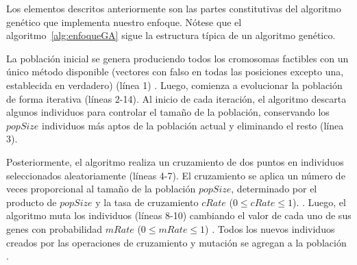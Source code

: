   
  




Los elementos descritos anteriormente son las partes constitutivas del algoritmo genético que implementa nuestro enfoque. 
Nótese que el algoritmo~\ref{alg:enfoqueGA} sigue la estructura típica de un algoritmo genético. 

La población inicial se genera produciendo todos los cromosomas factibles con un
único método disponible (vectores con falso en todas las posiciones excepto una,
establecida en verdadero) (línea 1) . 
Luego, comienza a evolucionar la población de forma iterativa (líneas 2-14). 
Al inicio de cada iteración, el algoritmo descarta algunos individuos para controlar el tamaño de la población, conservando los $popSize$ individuos más aptos de la población actual y eliminando el resto (línea 3).


Posteriormente, el algoritmo realiza un cruzamiento de dos puntos en individuos
seleccionados aleatoriamente (líneas 4-7). 
El cruzamiento se aplica un número de veces proporcional al tamaño de la población $popSize$, 
determinado por el producto de $popSize$ y la tasa de cruzamiento $cRate$ ($0
\leq cRate \leq 1$). . 
Luego, el algoritmo muta los individuos (líneas 8-10) cambiando el valor de cada
uno de sus genes con probabilidad $mRate$ ($0 \leq mRate \leq 1$) . 
Todos los nuevos individuos creados por las operaciones de cruzamiento y
mutación se agregan a la población .

